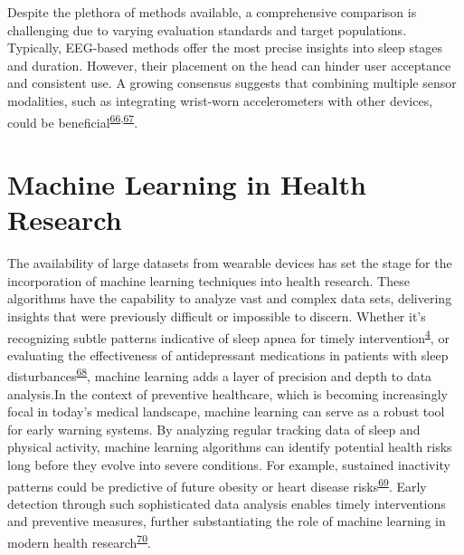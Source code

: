 \documentclass[
  9pt,
]{scrbook}
\begin{document}
Despite the plethora of methods available, a comprehensive comparison is
challenging due to varying evaluation standards and target populations.
Typically, EEG-based methods offer the most precise insights into sleep
stages and duration. However, their placement on the head can hinder
user acceptance and consistent use. A growing consensus suggests that
combining multiple sensor modalities, such as integrating wrist-worn
accelerometers with other devices, could be
beneficial\textsuperscript{\protect\hyperlink{ref-dezambotti_2019}{66},\protect\hyperlink{ref-imtiaz_2021}{67}}.

\hypertarget{machine-learning-in-health-research}{%
\section{Machine Learning in Health
Research}\label{machine-learning-in-health-research}}

The availability of large datasets from wearable devices has set the
stage for the incorporation of machine learning techniques into health
research. These algorithms have the capability to analyze vast and
complex data sets, delivering insights that were previously difficult or
impossible to discern. Whether it's recognizing subtle patterns
indicative of sleep apnea for timely
intervention\textsuperscript{\protect\hyperlink{ref-cappuccio_sleep_2010}{4}},
or evaluating the effectiveness of antidepressant medications in
patients with sleep
disturbances\textsuperscript{\protect\hyperlink{ref-paruthi_consensus_2016}{68}},
machine learning adds a layer of precision and depth to data analysis.In
the context of preventive healthcare, which is becoming increasingly
focal in today's medical landscape, machine learning can serve as a
robust tool for early warning systems. By analyzing regular tracking
data of sleep and physical activity, machine learning algorithms can
identify potential health risks long before they evolve into severe
conditions. For example, sustained inactivity patterns could be
predictive of future obesity or heart disease
risks\textsuperscript{\protect\hyperlink{ref-tremblay_sedentary_2017}{69}}.
Early detection through such sophisticated data analysis enables timely
interventions and preventive measures, further substantiating the role
of machine learning in modern health
research\textsuperscript{\protect\hyperlink{ref-liguori_evolving_2023}{70}}.
\end{document}
